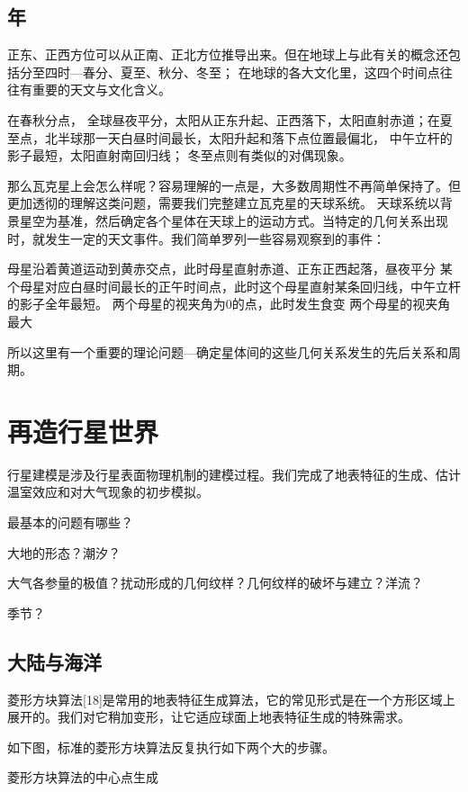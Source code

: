 \documentclass[a4paper,10.5pt]{book}
\begin{document}
\section{年}

正东、正西方位可以从正南、正北方位推导出来。但在地球上与此有关的概念还包括分至四时—春分、夏至、秋分、冬至；
在地球的各大文化里，这四个时间点往往有重要的天文与文化含义。

在春秋分点， 全球昼夜平分，太阳从正东升起、正西落下，太阳直射赤道；在夏至点，北半球那一天白昼时间最长，太阳升起和落下点位置最偏北，
中午立杆的影子最短，太阳直射南回归线； 冬至点则有类似的对偶现象。

那么瓦克星上会怎么样呢？容易理解的一点是，大多数周期性不再简单保持了。但更加透彻的理解这类问题，需要我们完整建立瓦克星的天球系统。
天球系统以背景星空为基准，然后确定各个星体在天球上的运动方式。当特定的几何关系出现时，就发生一定的天文事件。我们简单罗列一些容易观察到的事件：

母星沿着黄道运动到黄赤交点，此时母星直射赤道、正东正西起落，昼夜平分
某个母星对应白昼时间最长的正午时间点，此时这个母星直射某条回归线，中午立杆的影子全年最短。
两个母星的视夹角为0的点，此时发生食变
两个母星的视夹角最大

所以这里有一个重要的理论问题—确定星体间的这些几何关系发生的先后关系和周期。




\chapter{再造行星世界}

行星建模是涉及行星表面物理机制的建模过程。我们完成了地表特征的生成、估计温室效应和对大气现象的初步模拟。

最基本的问题有哪些？

大地的形态？潮汐？

大气各参量的极值？扰动形成的几何纹样？几何纹样的破坏与建立？洋流？

季节？

\section{大陆与海洋}

菱形方块算法[18]是常用的地表特征生成算法，它的常见形式是在一个方形区域上展开的。我们对它稍加变形，让它适应球面上地表特征生成的特殊需求。

如下图，标准的菱形方块算法反复执行如下两个大的步骤。


菱形方块算法的中心点生成
\end{document}

